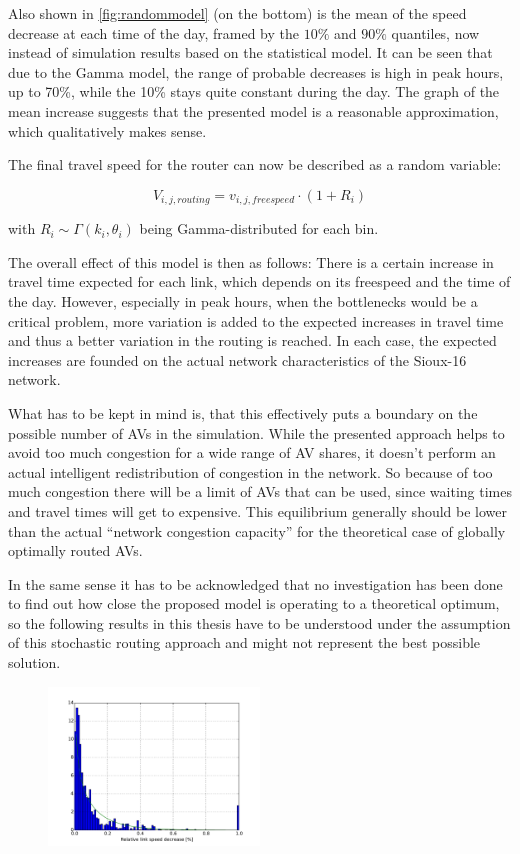 Also shown in \cref{fig:randommodel} (on the bottom) is the mean of the speed decrease at each time of the
day, framed by the $10\%$ and $90\%$ quantiles, now instead of simulation results based on the statistical model.
It can be seen that due to the Gamma model, the range of probable decreases is high in peak hours, up to 70\%,
while the 10\% stays quite constant during the day. The graph of the mean increase suggests that the presented
model is a reasonable approximation, which qualitatively makes sense.

The final travel speed for the router can now be described as a random variable:

\begin{equation}
    V_{i,j,routing} = v_{i,j,freespeed} \cdot (1 + R_i)
\end{equation}

with $R_i \sim \Gamma(k_i, \theta_i)$ being Gamma-distributed for each bin.

The overall effect of this model is then as follows: There is a certain increase
in travel time expected for each link, which depends on its freespeed and the time
of the day. However, especially in peak hours, when the bottlenecks would be a
critical problem, more variation is added to the expected increases in travel time
and thus a better variation in the routing is reached. In each case, the expected
increases are founded on the actual network characteristics of the Sioux-16 network.

What has to be kept in mind is, that this effectively puts a boundary on the
possible number of AVs in the simulation. While the presented approach helps to
avoid too much congestion for a wide range of AV shares, it doesn't perform an
actual intelligent redistribution of congestion in the network. So because of
too much congestion there will be a limit of AVs that can be used, since waiting
times and travel times will get to expensive. This equilibrium generally should
be lower than the actual ``network congestion capacity'' for the theoretical case
of globally optimally routed AVs.

In the same sense it has to be acknowledged that no investigation has been done
to find out how close the proposed model is operating to a theoretical optimum, so
the following results in this thesis have to be understood under the assumption
of this stochastic routing approach and might not represent the best possible
solution.

\begin{figure}
    \centering
    \includegraphics[width=0.5\textwidth]{figures/speeddecdist.pdf}
    \caption{}
    \label{fig:speeddecdist}
\end{figure}

